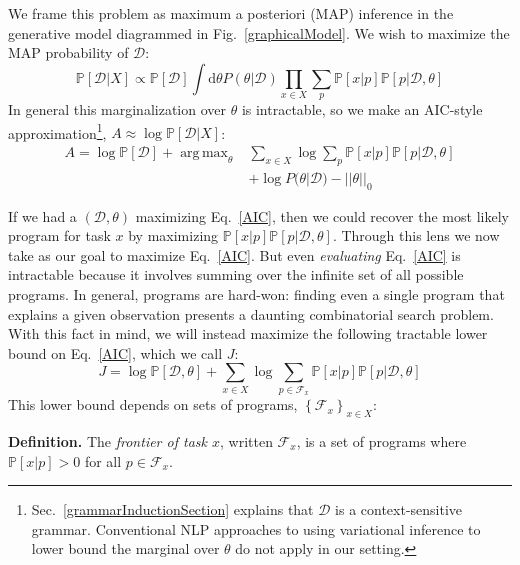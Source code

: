 \documentclass{article}
\DeclareMathOperator*{\argmax}{arg\,max} %
\newcommand{\probability}{\mathds{P}} %
\begin{document}
We frame this problem as maximum a posteriori (MAP) inference in the generative model diagrammed in Fig.~\ref{graphicalModel}. We wish to maximize the MAP probability of $\mathcal{D}$:
\begin{equation*}
  \probability[\mathcal{D}|X]\propto \probability[\mathcal{D}] \int \mathrm{d}\theta P(\theta|\mathcal{D})\prod_{x\in X} \sum_p \probability[x|p]\probability[p|\mathcal{D},\theta]
\end{equation*}
In general this marginalization over $\theta$ is intractable, so we make an AIC-style approximation\footnote{Sec.~\ref{grammarInductionSection} explains that $\mathcal{D}$ is a context-sensitive grammar.
Conventional NLP approaches to using variational inference to lower bound the marginal over $\theta$ do not apply in our setting.}, $A\approx \log\probability[\mathcal{D}|X] $:
\begin{align}
  A =   \log \probability[\mathcal{D}] + \argmax_{\theta}& \sum_{x\in X}\log \sum_p\probability[x|p]\probability[p|\mathcal{D},\theta]\nonumber\\
&+  \log P(\theta|\mathcal{D}) - ||\theta||_0 \label{AIC}
  \end{align}


If we had a $(\mathcal{D},\theta)$ maximizing Eq.~\ref{AIC}, then we could recover the most likely program for task $x$ by maximizing $\probability[x|p] \probability[p|\mathcal{D},\theta]$.
Through this lens we now take as our goal to maximize Eq.~\ref{AIC}.
But even \emph{evaluating} Eq.~\ref{AIC} is intractable because it involves summing over the infinite set of all possible programs. In general, programs are hard-won: finding even a single program that explains a given observation presents a daunting combinatorial search problem.
With this fact in mind, we will instead maximize the following tractable lower bound on Eq.~\ref{AIC},
which we call $J$:
\begin{equation}
J = \log \probability[\mathcal{D},\theta] + \sum_{x\in X}\log \sum_{p\in \mathcal{F}_x} \probability[x|p]\probability[p|\mathcal{D},\theta]\label{lowerBound}
\end{equation}
This lower bound depends on sets of programs, $\left\{\mathcal{F}_x \right\}_{x\in X}$:

\noindent\textbf{Definition.} The \emph{frontier of task $x$}, written $\mathcal{F}_x$,
is a set of programs where $\probability[x|p] > 0$ for all $p\in \mathcal{F}_x$.
\end{document}

